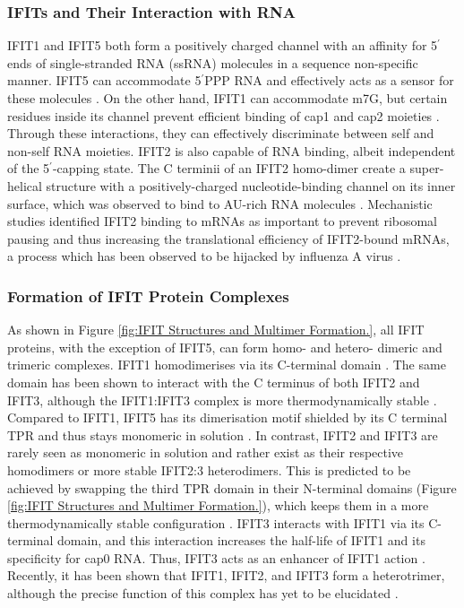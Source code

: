\subsubsection{IFITs and Their Interaction with RNA} \label{IFITs and Their Interaction with RNA}
IFIT1 and IFIT5 both form a positively charged channel with an affinity for 5$^{\prime}$ ends of single-stranded RNA (ssRNA) molecules in a sequence non-specific manner. IFIT5 can accommodate 5$^{\prime}$PPP RNA and effectively acts as a sensor for these molecules \cite{Abbas2013StructuralProteins, Pichlmair2011IFIT1RNA}. On the other hand, IFIT1 can accommodate m7G, but certain residues inside its channel prevent efficient binding of cap1 and cap2 moieties \cite{Diamond2014IFIT1:Translation, Mears2018BetterResponse}. Through these interactions, they can effectively discriminate between self and non-self RNA moieties. IFIT2 is also capable of RNA binding, albeit independent of the 5$^{\prime}$-capping state. The C terminii of an IFIT2 homo-dimer create a super-helical structure with a positively-charged nucleotide-binding channel on its inner surface, which was observed to bind to AU-rich RNA molecules \cite{Yang2012CrystalMechanisms, Vladimer2014IFITs:Proteins}. Mechanistic studies identified IFIT2 binding to mRNAs as important to prevent ribosomal pausing and thus increasing the translational efficiency of IFIT2-bound mRNAs, a process which has been observed to be hijacked by influenza A virus \cite{Tran2020InfluenzaMRNAs}.

\subsubsection{Formation of IFIT Protein Complexes} \label{Formation of IFIT Protein Complexes}
As shown in Figure \ref{fig:IFIT Structures and Multimer Formation.}, all IFIT proteins, with the exception of IFIT5, can form homo- and hetero- dimeric and trimeric complexes. IFIT1 homodimerises via its C-terminal domain \cite{Abbas2013StructuralProteins}. The same domain has been shown to interact with the C terminus of both IFIT2 and IFIT3, although the IFIT1:IFIT3 complex is more thermodynamically stable \cite{Fleith2018IFIT3RNA, Stawowczyk2011TheApoptosis}. Compared to IFIT1, IFIT5 has its dimerisation motif shielded by its C terminal TPR and thus stays monomeric in solution \cite{Kumar2014InhibitionMRNAs}. In contrast, IFIT2 and IFIT3 are rarely seen as monomeric in solution and rather exist as their respective homodimers or more stable IFIT2:3 heterodimers. This is predicted to be achieved by swapping the third TPR domain in their N-terminal domains (Figure \ref{fig:IFIT Structures and Multimer Formation.}), which keeps them in a more thermodynamically stable configuration \cite{Yang2012CrystalMechanisms}. IFIT3 interacts with IFIT1 via its C-terminal domain, and this interaction increases the half-life of IFIT1 and its specificity for cap0 RNA. Thus, IFIT3 acts as an enhancer of IFIT1 action \cite{Fleith2018IFIT3RNA, Johnson2018HumanStability}. Recently, it has been shown that IFIT1, IFIT2, and IFIT3 form a heterotrimer, although the precise function of this complex has yet to be elucidated \cite{Fleith2018IFIT3RNA}. 

